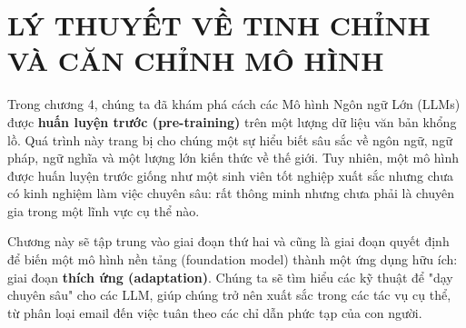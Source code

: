 \chapter{LÝ THUYẾT VỀ TINH CHỈNH VÀ CĂN CHỈNH MÔ HÌNH}
\label{chap:finetuning_alignment}

Trong chương 4, chúng ta đã khám phá cách các Mô hình Ngôn ngữ Lớn (LLMs) được \textbf{huấn luyện trước (pre-training)} trên một lượng dữ liệu văn bản khổng lồ. Quá trình này trang bị cho chúng một sự hiểu biết sâu sắc về ngôn ngữ, ngữ pháp, ngữ nghĩa và một lượng lớn kiến thức về thế giới. Tuy nhiên, một mô hình được huấn luyện trước giống như một sinh viên tốt nghiệp xuất sắc nhưng chưa có kinh nghiệm làm việc chuyên sâu: rất thông minh nhưng chưa phải là chuyên gia trong một lĩnh vực cụ thể nào.

Chương này sẽ tập trung vào giai đoạn thứ hai và cũng là giai đoạn quyết định để biến một mô hình nền tảng (foundation model) thành một ứng dụng hữu ích: giai đoạn \textbf{thích ứng (adaptation)}. Chúng ta sẽ tìm hiểu các kỹ thuật để "dạy chuyên sâu" cho các LLM, giúp chúng trở nên xuất sắc trong các tác vụ cụ thể, từ phân loại email đến việc tuân theo các chỉ dẫn phức tạp của con người.